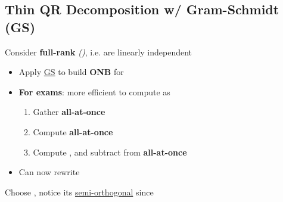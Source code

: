 \subsection*{Thin QR Decomposition w/ Gram-Schmidt (GS)}


Consider \textbf{full-rank}
\emph{()},
i.e. 
are linearly independent

\begin{itemize}

      \item
            Apply \underline{GS} 
            to build \textbf{ONB}
            for 
      \item
            \textbf{For exams}: more efficient to compute as

            \begin{enumerate}
                  \item
                        Gather
                        \textbf{all-at-once}
                  \item
                        Compute
                        \textbf{all-at-once}
                  \item
                        Compute , and
                        subtract from  \textbf{all-at-once}
            \end{enumerate}
      \item
            Can now rewrite
\end{itemize}

\hSep %

Choose
,
notice its \underline{semi-orthogonal} since

